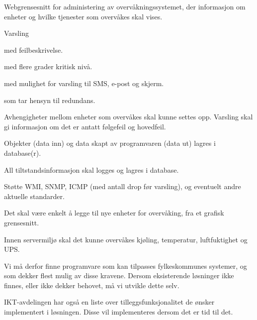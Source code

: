 \begin{itemize*}
	\item Webgrensesnitt for administering av overvåkningssystemet, der informasjon om enheter og hvilke tjenester som overvåkes skal vises.
	\item Varsling
	\begin{itemize*} 
		\item med feilbeskrivelse.
		\item med flere grader kritisk nivå.
		\item med mulighet for varsling til SMS, e-post og skjerm.
		\item som tar hensyn til redundans.
	\end{itemize*}
	\item Avhengigheter mellom enheter som overvåkes skal kunne settes opp. Varsling skal gi informasjon om det er antatt følgefeil og hovedfeil.
	\item Objekter (data inn) og data skapt av programvaren (data ut) lagres i database(r).
	\item All tiltstandsinformasjon skal logges og lagres i database.
	\item Støtte WMI, SNMP, ICMP (med antall drop før varsling), og eventuelt andre aktuelle standarder.
	\item Det skal være enkelt å legge til nye enheter for overvåking, fra et grafisk grensesnitt.
	\item Innen servermiljø skal det kunne overvåkes kjøling, temperatur, luftfuktighet og UPS.
\end{itemize*}

Vi må derfor finne programvare som kan tilpasses fylkeskommunes systemer, og som dekker flest mulig av disse kravene. Dersom eksisterende løsninger ikke finnes, eller ikke dekker behovet, må vi utvikle dette selv.

IKT-avdelingen har også en liste over tilleggsfunksjonalitet de ønsker implementert i løsningen. Disse vil implementeres dersom det er tid til det.

